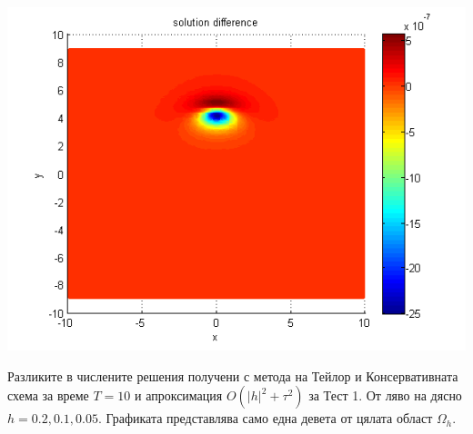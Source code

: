 \documentclass{beamer}
\begin{document}
\begin{frame}
\begin{center}
\begin{minipage}[b]{0.32\linewidth}
	\end{minipage}	
	\begin{minipage}[b]{0.32\linewidth}		
		\includegraphics[width=\linewidth]{../amitans/figures/compare_30_bt3_c045_h005.png}
	\end{minipage}
\end{center}
Разликите в числените решения получени с метода на Тейлор и Консервативната схема за време $T=10$ и апроксимация $O(|h|^2 + \tau^2)$ за Тест 1. От ляво на дясно $h=0.2, 0.1, 0.05$. Графиката представлява само една девета от цялата област $\Omega_h$.
\end{frame}

\end{document}
